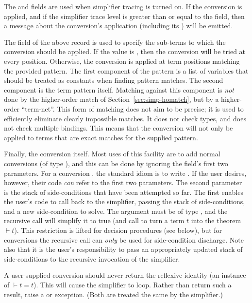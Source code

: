 The  and  fields are used when simplifier tracing
is turned on.  If the conversion is applied, and if the simplifier
trace level is greater than or equal to the  field, then a
message about the conversion's application (including its )
will be emitted.

The  field of the above record is used to specify the
sub-terms to which the conversion should be applied.  If the value is
, then the conversion will be tried at every position.
Otherwise, the conversion is applied at term positions matching the
provided pattern.  The first component of the pattern is a list of
variables that should be treated as constants when finding pattern
matches.  The second component is the term pattern itself.  Matching
against this component is \emph{not} done by the higher-order match of
Section~\ref{sec:simp-homatch}, but by a higher-order ``term-net''.
This form of matching does not aim to be precise; it is used to
efficiently eliminate clearly impossible matches.  It does not check
types, and does not check multiple bindings.  This means that the
conversion will not only be applied to terms that are exact matches
for the supplied pattern.

Finally, the conversion itself.  Most uses of this facility are to add
normal \HOL{} conversions (of type ), and this can be
done by ignoring the  field's first two parameters.  For a
conversion , the standard idiom is to write
.  If the user desires, however, their code
\emph{can} refer to the first two parameters.  The second parameter is
the stack of side-conditions that have been attempted so far.  The
first enables the user's code to call back to the simplifier, passing
the stack of side-conditions, and a new side-condition to solve.  The
 argument must be of type , and the recursive
call will simplify it to true (and call  to turn a term
$t$ into the theorem $\vdash t$).  This restriction is lifted for
decision procedures (see below), but for conversions the recursive call can
\emph{only} be used for side-condition discharge. Note also that it
is the user's responsibility to pass an appropriately updated stack of
side-conditions to the recursive invocation of the simplifier.

A user-supplied conversion should never return the reflexive identity
(an instance of $\vdash t = t$).  This will cause the simplifier to
loop.  Rather than return such a result, raise a  or
 exception.  (Both are treated the same by the simplifier.)



